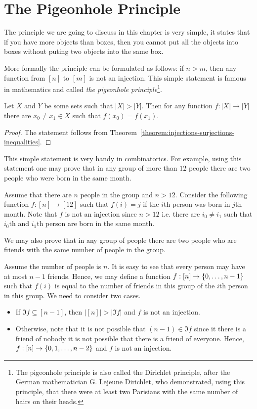 \chapter{The Pigeonhole Principle}

The principle we are going to discuss in this chapter is very simple, it states
that if you have more objects than boxes, then you cannot put all the objects into
boxes without puting two objects into the same box.

More formally the principle can be formulated as follows: if $n > m$, then any
function from $[n]$ to $[m]$ is not an injection. This simple statement is
famous in mathematics and called \emph{the pigeonhole principle}\footnote{%
  The pigeonhole principle is also called the Dirichlet principle, after the
  German mathematician G. Lejeune Dirichlet, who demonstrated, using this
  principle, that there were at least two Parisians with the same number of
  hairs on their heads.
}.

\begin{theorem}
  Let $X$ and $Y$ be some sets such that $|X| > |Y|$. Then for any function
  $f : |X| \to |Y|$ there are $x_0 \neq x_1 \in X$ such that $f(x_0) = f(x_1)$.
\end{theorem}
\begin{proof}
  The statement follows from
  Theorem~\ref{theorem:injections-surjections-inequalities}.
\end{proof}

This simple statement is very handy in combinatorics. For example, using this
statement one may prove that in any group of more than $12$ people there are
two people who were born in the same month.

Assume that there are $n$ people in the group and $n > 12$.
Consider the following function $f : [n] \to [12]$ such that $f(i) = j$ if the
$i$th person was born in $j$th month. Note that $f$ is not an injection since
$n > 12$ i.e. there are $i_0 \neq i_1$ such that $i_0$th and $i_1$th person are
born in the same month.

We may also prove that in any group of people there are two people who are
friends with the same number of people in the group.

Assume the number of people is $n$. It is easy to see that every person may
have at most $n - 1$ friends. Hence, we may define a function $f: [n] \to
\set{0, \dots, n - 1}$ such that $f(i)$ is equal to the number of friends in
this group of the $i$th person in this group.
We need to consider two cases.
\begin{itemize}
  \item If $\Im f \subseteq [n - 1]$, then
    $|[n]| > |\Im f|$ and $f$ is not an injection.
  \item Otherwise, note that it is not possible that $(n - 1) \in \Im f$
    since it there is a friend of nobody it is not possible that there is a
    friend of everyone. Hence, $f : [n] \to \set{0, 1, \dots, n - 2}$ and $f$ is
    not an injection.
\end{itemize}

